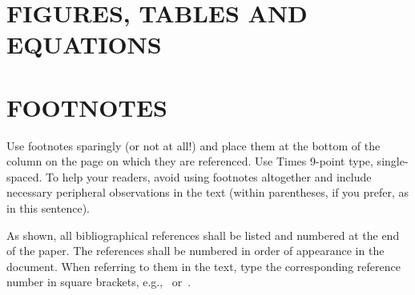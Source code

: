 \documentclass{article}
\begin{document}
\section{FIGURES, TABLES AND EQUATIONS}
\label{sec:floats}






\vfill
\pagebreak

\section{FOOTNOTES}
\label{sec:foot}

Use footnotes sparingly (or not at all!) and place them at the bottom of the
column on the page on which they are referenced. Use Times 9-point type,
single-spaced. To help your readers, avoid using footnotes altogether and
include necessary peripheral observations in the text (within parentheses, if
you prefer, as in this sentence).




\noindent As shown, all bibliographical references shall be listed and numbered at the end of the paper. The references shall be numbered in order of appearance in the document.  When referring to them in the text, type the corresponding reference number in square brackets, e.g.,~\cite{C1} or~\cite{C1,C2}.

\end{document}
